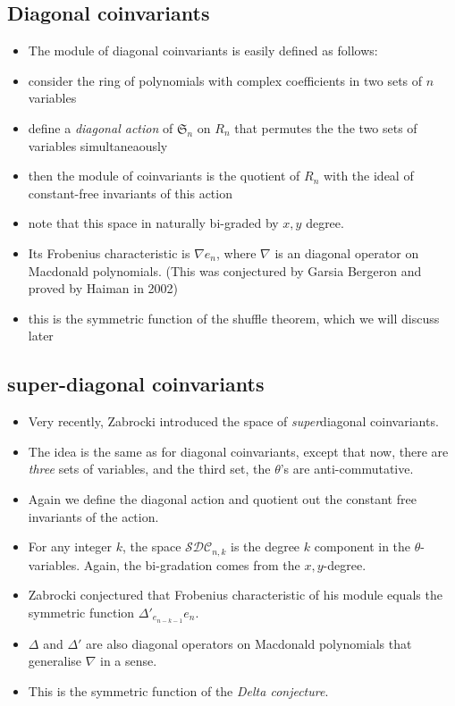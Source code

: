 \documentclass[12pt]{article}
\begin{document}
    \subsection{Diagonal coinvariants}    
    \begin{itemize}
        \item The module of diagonal coinvariants is easily defined as follows:
        \item consider the ring of polynomials with complex coefficients in two sets of $n$ variables
        \item define a \emph{diagonal action} of $\mathfrak{S}_n$ on $R_n$ that permutes the the two sets of variables simultaneaously
        \item then the module of coinvariants is the quotient of $R_n$ with the ideal of constant-free invariants of this action
        \item note that this space in naturally bi-graded by $x,y$ degree. 
        \item Its Frobenius characteristic is $\nabla e_n$, where $\nabla$ is an diagonal operator on Macdonald polynomials. (This was conjectured by Garsia Bergeron and proved by Haiman in 2002)
        \item this is the symmetric function of the shuffle theorem, which we will discuss later
    \end{itemize}
    \subsection{super-diagonal coinvariants}
    \begin{itemize}
        \item Very recently, Zabrocki introduced the space of \emph{super}diagonal coinvariants. 
        \item The idea is the same as for diagonal coinvariants, except that now, there are \emph{three} sets of variables, and the third set, the $\theta$'s are anti-commutative.
        \item Again we define the diagonal action and quotient out the constant free invariants of the action. 
        \item For any integer $k$, the space $\mathcal{SDC}_{n,k}$ is the degree $k$ component in the $\theta$-variables. Again, the bi-gradation comes from the $x,y$-degree.
        \item Zabrocki conjectured that Frobenius characteristic of his module equals the symmetric function $\Delta'_{e_{n-k-1}}e_n$. 
        \item $\Delta$ and $\Delta'$ are also diagonal operators on Macdonald polynomials that generalise $\nabla$ in a sense. 
        \item This is the symmetric function of the \emph{Delta conjecture}.
    \end{itemize}
\end{document}
